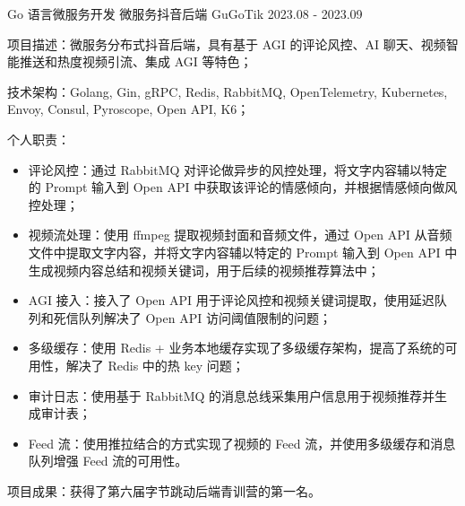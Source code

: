 

\begin{cventries}

  \cventry
    {Go 语言微服务开发} %
    {微服务抖音后端 GuGoTik} %
    {2023.08 - 2023.09} %
    {} %
    {
      \begin{cvitems} %
        \item {项目描述：微服务分布式抖音后端，具有基于 AGI 的评论风控、AI 聊天、视频智能推送和热度视频引流、集成 AGI 等特色；}
        \item {技术架构：Golang, Gin, gRPC, Redis, RabbitMQ, OpenTelemetry, Kubernetes, Envoy, Consul, Pyroscope, Open API, K6；}
        \item {个人职责：}
          \begin{itemize}
            \item {评论风控：通过 RabbitMQ 对评论做异步的风控处理，将文字内容辅以特定的 Prompt 输入到 Open API 中获取该评论的情感倾向，并根据情感倾向做风控处理；}
            \item {视频流处理：使用 ffmpeg 提取视频封面和音频文件，通过 Open API 从音频文件中提取文字内容，并将文字内容辅以特定的 Prompt 输入到 Open API 中生成视频内容总结和视频关键词，用于后续的视频推荐算法中；}
            \item {AGI 接入：接入了 Open API 用于评论风控和视频关键词提取，使用延迟队列和死信队列解决了 Open API 访问阈值限制的问题；}
            \item {多级缓存：使用 Redis + 业务本地缓存实现了多级缓存架构，提高了系统的可用性，解决了 Redis 中的热 key 问题；}
            \item {审计日志：使用基于 RabbitMQ 的消息总线采集用户信息用于视频推荐并生成审计表；}
            \item {Feed 流：使用推拉结合的方式实现了视频的 Feed 流，并使用多级缓存和消息队列增强 Feed 流的可用性。}
          \end{itemize}
        \item {项目成果：获得了第六届字节跳动后端青训营的第一名。}
      \end{cvitems}
    }


\end{cventries}
